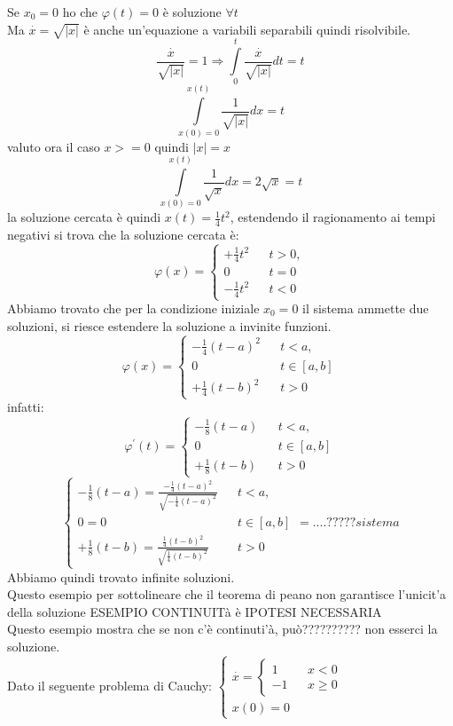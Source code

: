 Se $x_0 = 0$ ho che $\varphi(t)=0$ è soluzione $\forall t$\\
Ma $\overset{\cdot}{x} = \sqrt{|x|}$ è anche un'equazione a variabili separabili quindi risolvibile.\\
$$\frac{\overset{\cdot}{x}}{\sqrt{|x|}}=1 \Rightarrow \int\limits_{0}^{t}{\frac{\overset{\cdot}{x}}{\sqrt{|x|}}dt} = t$$
$$\int\limits_{x(0)=0}^{x(t)}{\frac{1}{\sqrt{|x|}}dx} = t$$
valuto ora il caso $x>=0$ quindi $|x|=x$
$$ \int\limits_{x(0)=0}^{x(t)}{\frac{1}{\sqrt{x}}dx} = 2\sqrt{x} = t$$ 
la soluzione cercata è quindi $x(t)=\frac{1}{4}t^2$, 
estendendo il ragionamento ai tempi negativi si trova che la soluzione cercata è: $$\varphi(x)= \left\{\begin{matrix}+\frac{1}{4}t^2&&t>0,\\0&&t=0\\-\frac{1}{4}t^2&&t<0\end{matrix}\right.$$ 
Abbiamo trovato che per la condizione iniziale $x_0=0$ il sistema ammette due soluzioni, si riesce estendere la soluzione a invinite funzioni.
$$\varphi(x)= \left\{\begin{matrix}-\frac{1}{4}(t-a)^2&&t<a,\\0&&t\in[a,b]\\+\frac{1}{4}(t-b)^2&&t>0\end{matrix}\right.$$
infatti:
$$\varphi^{'}(t) = \left\{\begin{matrix}-\frac{1}{8}(t-a)&&t<a,\\0&&t\in[a,b]\\+\frac{1}{8}(t-b)&&t>0\end{matrix}\right.$$ $$\left\{\begin{matrix}-\frac{1}{8}(t-a)=\frac{-\frac{1}{4}(t-a)^2}{	\sqrt{-\frac{1}{4}(t-a)^2}}&&t<a,\\0=0&&t\in[a,b]\\+\frac{1}{8}(t-b)=\frac{\frac{1}{4}(t-b)^2}{\sqrt{\frac{1}{4}(t-b)^2}}&&t>0\end{matrix}\right. = ....????? sistema $$
Abbiamo quindi trovato infinite soluzioni.\\
Questo esempio per sottolineare che il teorema di peano non garantisce l'unicit'a della soluzione
ESEMPIO CONTINUITà è IPOTESI NECESSARIA\\
Questo esempio mostra che se non c'è continuti'à, può?????????? non esserci la soluzione.\\
Dato il seguente problema di Cauchy: $\left\{\begin{matrix}
\overset{\cdot}{x} = \left\{\begin{matrix}1&&x<0\\-1&&x\ge 0\end{matrix}\right.\\
x(0)=0
\end{matrix}\right.$\\
